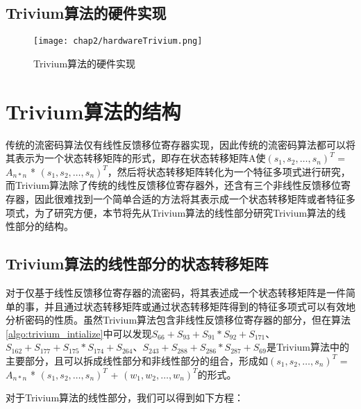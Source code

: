 \subsection{Trivium算法的硬件实现}

\begin{figure}[H]
	\centering
	\texttt{[image: chap2/hardwareTrivium.png]}
	\caption{Trivium算法的硬件实现}\label{fig:Trivium算法的硬件实现}
\end{figure}

\section{Trivium算法的结构}

传统的流密码算法仅有线性反馈移位寄存器实现，因此传统的流密码算法都可以将其表示为一个状态转移矩阵的形式，即存在状态转移矩阵A使$(s_{1}, s_{2}, \ldots, s_{n})^{T}$ = $A_{n*n}$ * $(s_{1}, s_{2}, \ldots, s_{n})^{T}$，然后将状态转移矩阵转化为一个特征多项式进行研究，而Trivium算法除了传统的线性反馈移位寄存器外，还含有三个非线性反馈移位寄存器，因此很难找到一个简单合适的方法将其表示成一个状态转移矩阵或者特征多项式，为了研究方便，本节将先从Trivium算法的线性部分研究Trivium算法的线性部分的结构。

\subsection{Trivium算法的线性部分的状态转移矩阵}

对于仅基于线性反馈移位寄存器的流密码，将其表述成一个状态转移矩阵是一件简单的事，并且通过状态转移矩阵或通过状态转移矩阵得到的特征多项式可以有效地分析密码的性质。虽然Trivium算法包含非线性反馈移位寄存器的部分，但在算法\ref{algo:trivium_intialize}中可以发现$S_{66} + S_{93} + S_{91} * S_{92} + S_{171}$、$S_{162} + S_{177} + S_{175} * S_{174} + S_{264}$、$S_{243} + S_{288} + S_{286} * S_{287} + S_{69}$是Trivium算法中的主要部分，且可以拆成线性部分和非线性部分的组合，形成如$(s_{1}, s_{2}, \ldots, s_{n})^{T}$ = $A_{n*n}$ * $(s_{1}, s_{2}, \ldots, s_{n})^{T}$ + $(w_{1}, w_{2}, \ldots, w_{n})^{T}$的形式。

对于Trivium算法的线性部分，我们可以得到如下方程：

